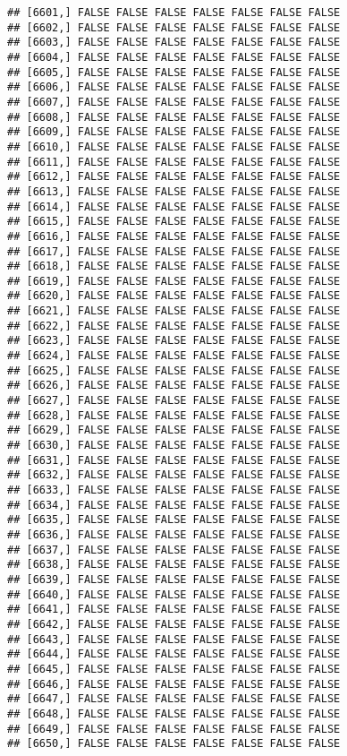 \documentclass[
]{article}
\begin{document}
\begin{verbatim}
## [6601,] FALSE FALSE FALSE FALSE FALSE FALSE FALSE
## [6602,] FALSE FALSE FALSE FALSE FALSE FALSE FALSE
## [6603,] FALSE FALSE FALSE FALSE FALSE FALSE FALSE
## [6604,] FALSE FALSE FALSE FALSE FALSE FALSE FALSE
## [6605,] FALSE FALSE FALSE FALSE FALSE FALSE FALSE
## [6606,] FALSE FALSE FALSE FALSE FALSE FALSE FALSE
## [6607,] FALSE FALSE FALSE FALSE FALSE FALSE FALSE
## [6608,] FALSE FALSE FALSE FALSE FALSE FALSE FALSE
## [6609,] FALSE FALSE FALSE FALSE FALSE FALSE FALSE
## [6610,] FALSE FALSE FALSE FALSE FALSE FALSE FALSE
## [6611,] FALSE FALSE FALSE FALSE FALSE FALSE FALSE
## [6612,] FALSE FALSE FALSE FALSE FALSE FALSE FALSE
## [6613,] FALSE FALSE FALSE FALSE FALSE FALSE FALSE
## [6614,] FALSE FALSE FALSE FALSE FALSE FALSE FALSE
## [6615,] FALSE FALSE FALSE FALSE FALSE FALSE FALSE
## [6616,] FALSE FALSE FALSE FALSE FALSE FALSE FALSE
## [6617,] FALSE FALSE FALSE FALSE FALSE FALSE FALSE
## [6618,] FALSE FALSE FALSE FALSE FALSE FALSE FALSE
## [6619,] FALSE FALSE FALSE FALSE FALSE FALSE FALSE
## [6620,] FALSE FALSE FALSE FALSE FALSE FALSE FALSE
## [6621,] FALSE FALSE FALSE FALSE FALSE FALSE FALSE
## [6622,] FALSE FALSE FALSE FALSE FALSE FALSE FALSE
## [6623,] FALSE FALSE FALSE FALSE FALSE FALSE FALSE
## [6624,] FALSE FALSE FALSE FALSE FALSE FALSE FALSE
## [6625,] FALSE FALSE FALSE FALSE FALSE FALSE FALSE
## [6626,] FALSE FALSE FALSE FALSE FALSE FALSE FALSE
## [6627,] FALSE FALSE FALSE FALSE FALSE FALSE FALSE
## [6628,] FALSE FALSE FALSE FALSE FALSE FALSE FALSE
## [6629,] FALSE FALSE FALSE FALSE FALSE FALSE FALSE
## [6630,] FALSE FALSE FALSE FALSE FALSE FALSE FALSE
## [6631,] FALSE FALSE FALSE FALSE FALSE FALSE FALSE
## [6632,] FALSE FALSE FALSE FALSE FALSE FALSE FALSE
## [6633,] FALSE FALSE FALSE FALSE FALSE FALSE FALSE
## [6634,] FALSE FALSE FALSE FALSE FALSE FALSE FALSE
## [6635,] FALSE FALSE FALSE FALSE FALSE FALSE FALSE
## [6636,] FALSE FALSE FALSE FALSE FALSE FALSE FALSE
## [6637,] FALSE FALSE FALSE FALSE FALSE FALSE FALSE
## [6638,] FALSE FALSE FALSE FALSE FALSE FALSE FALSE
## [6639,] FALSE FALSE FALSE FALSE FALSE FALSE FALSE
## [6640,] FALSE FALSE FALSE FALSE FALSE FALSE FALSE
## [6641,] FALSE FALSE FALSE FALSE FALSE FALSE FALSE
## [6642,] FALSE FALSE FALSE FALSE FALSE FALSE FALSE
## [6643,] FALSE FALSE FALSE FALSE FALSE FALSE FALSE
## [6644,] FALSE FALSE FALSE FALSE FALSE FALSE FALSE
## [6645,] FALSE FALSE FALSE FALSE FALSE FALSE FALSE
## [6646,] FALSE FALSE FALSE FALSE FALSE FALSE FALSE
## [6647,] FALSE FALSE FALSE FALSE FALSE FALSE FALSE
## [6648,] FALSE FALSE FALSE FALSE FALSE FALSE FALSE
## [6649,] FALSE FALSE FALSE FALSE FALSE FALSE FALSE
## [6650,] FALSE FALSE FALSE FALSE FALSE FALSE FALSE

\end{verbatim}
\end{document}
